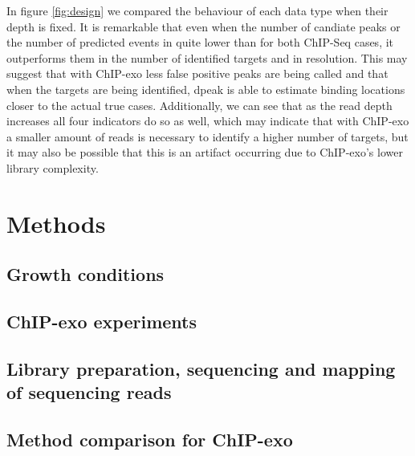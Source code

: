 \documentclass{bmcart}\usepackage[]{graphicx}\usepackage[]{color}
\begin{document}
In figure \ref{fig:design} we compared the behaviour of each data type
when their depth is fixed. It is remarkable that even when the number
of candiate peaks or the number of predicted events in quite lower
than for both ChIP-Seq cases, it outperforms them in the number of
identified targets and in resolution. This may suggest that with
ChIP-exo less false positive peaks are being called and that when the
targets are being identified, dpeak is able to estimate binding
locations closer to the actual true cases. Additionally, we can see
that as the read depth increases all four indicators do so as well,
which may indicate that with ChIP-exo a smaller amount of reads is
necessary to identify a higher number of targets, but it may also be
possible that this is an artifact occurring due to ChIP-exo's lower
library complexity.



\newpage


\section{Methods}
\label{sec:methods}

\subsection{Growth conditions}
\label{sec:growth}


\subsection{ChIP-exo experiments}
\label{sec:experiments}



\subsection{Library preparation, sequencing and mapping of sequencing reads}
\label{sec:library}

\subsection{Method comparison for ChIP-exo}
\label{sec:method_comp}








\nocite{exo_gb}
\end{document}

